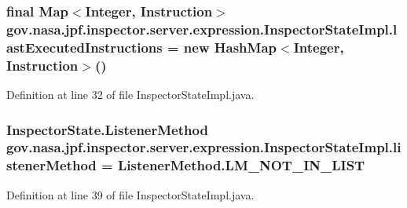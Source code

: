 \subsubsection[{\texorpdfstring{last\+Executed\+Instructions}{lastExecutedInstructions}}]{\setlength{\rightskip}{0pt plus 5cm}final Map$<$Integer, Instruction$>$ gov.\+nasa.\+jpf.\+inspector.\+server.\+expression.\+Inspector\+State\+Impl.\+last\+Executed\+Instructions = new Hash\+Map$<$Integer, Instruction$>$()\hspace{0.3cm}{\ttfamily [private]}}\hypertarget{classgov_1_1nasa_1_1jpf_1_1inspector_1_1server_1_1expression_1_1_inspector_state_impl_a51d0e82854748641ec231294a250d4eb}{}\label{classgov_1_1nasa_1_1jpf_1_1inspector_1_1server_1_1expression_1_1_inspector_state_impl_a51d0e82854748641ec231294a250d4eb}


Definition at line 32 of file Inspector\+State\+Impl.\+java.

\subsubsection[{\texorpdfstring{listener\+Method}{listenerMethod}}]{\setlength{\rightskip}{0pt plus 5cm}Inspector\+State.\+Listener\+Method gov.\+nasa.\+jpf.\+inspector.\+server.\+expression.\+Inspector\+State\+Impl.\+listener\+Method = {\bf Listener\+Method.\+L\+M\+\_\+\+N\+O\+T\+\_\+\+I\+N\+\_\+\+L\+I\+ST}\hspace{0.3cm}{\ttfamily [private]}}\hypertarget{classgov_1_1nasa_1_1jpf_1_1inspector_1_1server_1_1expression_1_1_inspector_state_impl_a6cc5f61624118469f3c43361c867f439}{}\label{classgov_1_1nasa_1_1jpf_1_1inspector_1_1server_1_1expression_1_1_inspector_state_impl_a6cc5f61624118469f3c43361c867f439}


Definition at line 39 of file Inspector\+State\+Impl.\+java.

